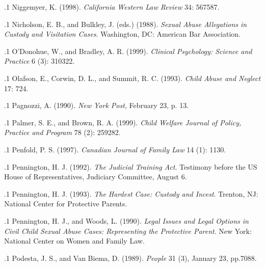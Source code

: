 \documentclass[11pt, twoside]{article}
\begin{document}
{\p.1{%
Niggemyer, K. (1998).  \textit{California Western Law Review} 34: 567\ndash{}587.
}%

\p.1{%
Nicholson, E. B., and Bulkley, J. (eds.) (1988). \textit{Sexual Abuse Allegations in Custody
and Visitation Cases}. Washington, DC: American Bar Association.
}%

\p.1{%
O’Donohue, W., and Bradley, A. R. (1999).  \textit{Clinical Psychology: Science and Practice} 6 (3):
310\ndash{}322.
}%

\p.1{%
Olafson, E., Corwin, D. L., and Summit, R. C. (1993).  \textit{Child Abuse and Neglect}
17: 7\ndash{}24.
}%

\p.1{%
Pagnozzi, A. (1990).  \textit{New York Post}, February 23, p. 13.
}%

\p.1{%
Palmer, S. E., and Brown, R. A. (1999).  \textit{Child Welfare \mdash{} Journal of Policy, Practice and Program}
78 (2): 259\ndash{}282.
}%

\p.1{%
Penfold, P. S. (1997).  \textit{Canadian Journal of Family Law} 14 (1): 11\ndash{}30.
}%

\p.1{%
Pennington, H. J. (1992). \textit{The Judicial Training Act}. Testimony before the US House
of Representatives, Judiciary Committee, August 6.
}%

\p.1{%
Pennington, H. J. (1993). \textit{The Hardest Case: Custody and Incest}. Trenton, NJ: National
Center for Protective Parents.
}%

\p.1{%
Pennington, H. J., and Woods, L. (1990). \textit{Legal Issues and Legal Options in Civil Child
Sexual Abuse Cases: Representing the Protective Parent}. New York: National Center
on Women and Family Law.
}%

\p.1{%
Podesta, J. S., and Van Biema, D. (1989).  \textit{People} 31 (3), January 23, pp.\@ 70\ndash{}88.
}%

}
\end{document}

